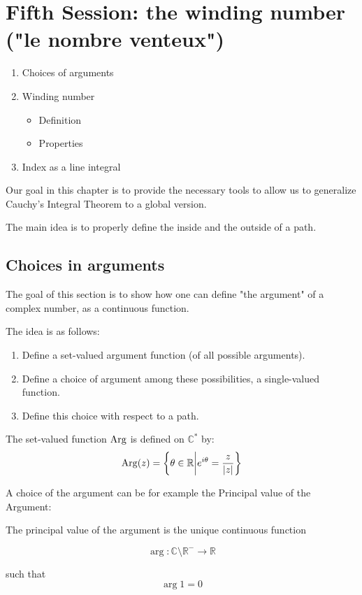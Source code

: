 \section{Fifth Session: the winding number ("le nombre venteux")}
\begin{enumerate}
    \item Choices of arguments
    \item Winding number
        \begin{itemize}
            \item Definition
            \item Properties
            \end{itemize}
    \item Index as a line integral
\end{enumerate}

Our goal in this chapter is to provide the necessary tools to allow us to generalize Cauchy's Integral Theorem to a global version.

The main idea is to properly define the inside and the outside of a path.

\subsection{Choices in arguments}

The goal of this section is to show how one can define "the argument" of a complex number, as a continuous function. 

The idea is as follows:
\begin{enumerate}
    \item Define a set-valued argument function (of all possible arguments).
    \item Define a choice of argument among these possibilities, a single-valued function.
    \item Define this choice with respect to a path.
\end{enumerate}

\begin{defi}
    The set-valued function $\operatorname{Arg}$ is defined on $\mathbb{C}^*$ by:
$$ \operatorname{Arg}(z) = \left \lbrace \theta \in \mathbb{R} \bigg\vert e^{i\theta} = \frac{z}{|z|}\right \rbrace$$
\end{defi}

A choice of the argument can be for example the Principal value of the Argument:

\begin{thm*}
    The principal value of the argument is the unique continuous function

    $$\arg: \mathbb{C} \setminus \mathbb{R}^{-} \rightarrow \mathbb{R}$$

    such that $$ \arg 1 = 0$$ 
\end{thm*}

